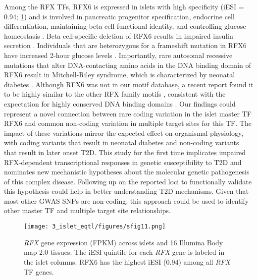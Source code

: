 Among the RFX TFs, RFX6 is expressed in islets with high specificity (iESI = 0.94; \ref{fig:c2_sf11}) and is involved in pancreatic progenitor specification, endocrine cell differentiation, maintaining beta cell functional identity, and controlling glucose homeostasis \cite{zhuGenomeEditingLineage2016, smithRfx6DirectsIslet2010, soyerRfx6Ngn3dependentWinged2010}. Beta cell-specific deletion of RFX6 results in impaired insulin secretion \cite{piccandRfx6MaintainsFunctional2014a, chandraRFX6RegulatesInsulin2014}. Individuals that are heterozygous for a frameshift mutation in RFX6 have increased 2-hour glucose levels \cite{huopioClinicalGeneticBiochemical2016}. Importantly, rare autosomal recessive mutations that alter DNA-contacting amino acids in the DNA binding domain of RFX6 result in Mitchell-Riley syndrome, which is characterized by neonatal diabetes \cite{smithRfx6DirectsIslet2010}. Although RFX6 was not in our motif database, a recent report found it to be highly similar to the other RFX family motifs \cite{lizioMappingMammalianCelltypespecific2015}, consistent with the expectation for highly conserved DNA binding domains \cite{aftabIdentificationCharacterizationNovel2008}. Our findings could represent a novel connection between rare coding variation in the islet master TF RFX6 \cite{soyerRfx6Ngn3dependentWinged2010, piccandRfx6MaintainsFunctional2014a} and common non-coding variation in multiple target sites for this TF. The impact of these variations mirror the expected effect on organismal physiology, with coding variants that result in neonatal diabetes and non-coding variants that result in later onset T2D. This study for the first time implicates impaired RFX-dependent transcriptional responses in genetic susceptibility to T2D and nominates new mechanistic hypotheses about the molecular genetic pathogenesis of this complex disease. Following up on the reported loci to functionally validate this hypothesis could help in better understanding T2D mechanisms. Given that most other GWAS SNPs are non-coding, this approach could be used to identify other master TF and multiple target site relationships.

\begin{figure}
    \centering
    \texttt{[image: 3\_islet\_eqtl/figures/sfig11.png]}
    \caption[\textit{RFX} gene expression (FPKM) across islets and 16 Illumina Body map 2.0 tissues]{\textit{RFX} gene expression (FPKM) across islets and 16 Illumina Body map 2.0 tissues. The iESI quintile for each \textit{RFX} gene is labeled in the islet columns. RFX6 has the highest iESI (0.94) among all \textit{RFX} TF genes.}
    \label{fig:c2_sf11}
\end{figure}


